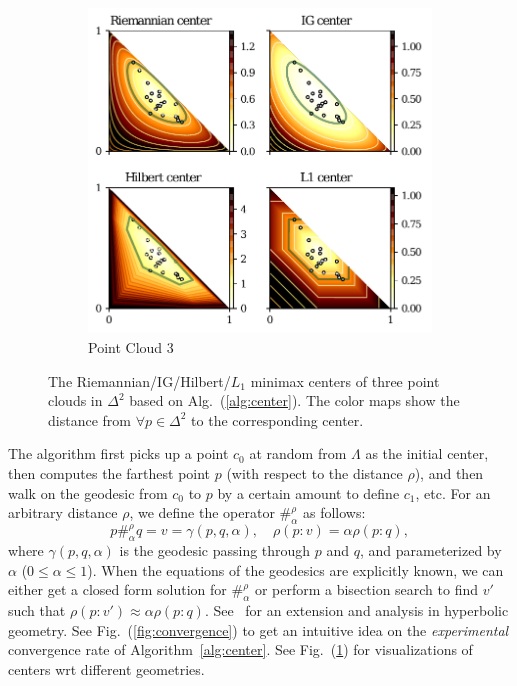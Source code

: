 \documentclass[graybox]{svmult}
\begin{document}
\begin{figure}[!htb]\ContinuedFloat
\centering
\begin{subfigure}[m]{.7\textwidth}
\includegraphics[width=\textwidth]{center3}%
\caption{Point Cloud 3}
\end{subfigure}
\caption{The Riemannian/IG/Hilbert/$L_1$  minimax centers of three point clouds
in $\Delta^2$ based on Alg.~(\ref{alg:center}).
The color maps show the distance from $\forall{p}\in\Delta^2$ to the corresponding center.}
\label{fig:center}
\end{figure}

The algorithm first picks up a point $c_0$ at random from $\Lambda$ as the initial center,
then computes the farthest point $p$ (with respect to the distance $\rho$),
and then walk on the geodesic from $c_0$ to $p$ by a certain amount to define $c_1$, etc. 
For an arbitrary distance $\rho$, we define the operator $\#^\rho_\alpha$ as follows:
$$
p \#^\rho_\alpha q = v=\gamma(p,q,\alpha), \quad \rho(p:v)=\alpha \rho(p:q),
$$
where $\gamma(p,q,\alpha)$ is the geodesic passing through $p$ and $q$, and parameterized by $\alpha$ ($0\le\alpha\le1$).
When the equations of the geodesics are explicitly known, we can either get a closed form solution for $\#^\rho_\alpha$
or perform a bisection search to find $v'$ such that $\rho(p:v')\approx\alpha\rho(p:q)$.
See~\cite{ApproximatingHyperbolicBall-2015} for an extension and analysis in hyperbolic geometry.
See Fig.~(\ref{fig:convergence}) to get an intuitive idea on the {\em experimental} convergence rate of Algorithm~\ref{alg:center}.
See Fig.~(\ref{fig:center}) for visualizations of centers wrt different geometries.
\end{document}
